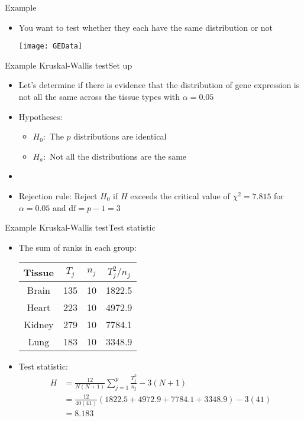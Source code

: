 \documentclass[xcolor=dvipsnames]{beamer}
\begin{document}
\begin{frame}{Example}
	\begin{itemize}
		\item You want to test whether they each have the same distribution or not
		\begin{center}
			\texttt{[image: GEData]}
		\end{center}
	\end{itemize}
\end{frame}

\begin{frame}{Example Kruskal-Wallis test}{Set up}
	\begin{itemize}
		\item Let's determine if there is evidence that the distribution of gene expression is not all the same across the tissue types with $\alpha = 0.05$
		\item Hypotheses:
		\begin{itemize}
			\item $H_0:$ The $p$ distributions are identical
			\item $H_a:$ Not all the distributions are the same
		\end{itemize}
		\item[]
		\item Rejection rule: Reject $H_0$ if $H$ exceeds the critical value of $\chi^2 = 7.815$ for $\alpha = 0.05$ and $\text{df} = p - 1 = 3$
	\end{itemize}
\end{frame}

\begin{frame}{Example Kruskal-Wallis test}{Test statistic}
	\begin{itemize}
		\item The sum of ranks in each group:
		\begin{center}
			\begin{tabular}{|c|c|c|c|}
				\hline
				\textbf{Tissue} &  $T_j$ & $n_j$ & $T_j^2 / n_j$  \\ \hline \hline  
				Brain & 135 & 10 & 1822.5 \\ \hline 
				Heart & 223 & 10 & 4972.9\\ \hline 
				Kidney & 279 & 10 & 7784.1\\ \hline 
				Lung & 183 & 10 & 3348.9\\ \hline 
			\end{tabular}
		\end{center}
		\item Test statistic:
		\begin{align*}
			H &= \frac{12}{N (N+1)} \sum_{j=1}^p \frac{T_j^2}{n_j} - 3(N + 1) \\
			&= \frac{12}{40(41)} (1822.5 + 4972.9 + 7784.1 + 3348.9) - 3 (41) \\
			&= 8.183
		\end{align*}
	\end{itemize}
\end{frame}
\end{document}
